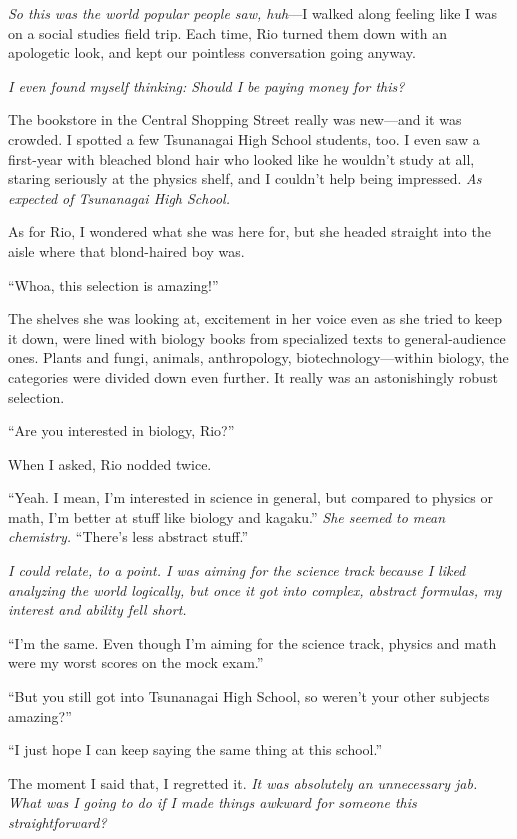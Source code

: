 \documentclass[
    a4paper,
    12pt,
    twoside,
    openany,
    UTF8,
    fontset=windows
]{ctexbook}
\begin{document}
\textit{So this was the world popular people saw, huh}---I walked along feeling like I was on a social studies field trip. Each time, Rio turned them down with an apologetic look, and kept our pointless conversation going anyway.

\textit{I even found myself thinking: Should I be paying money for this?}

The bookstore in the Central Shopping Street really was new---and it was crowded. I spotted a few Tsunanagai High School students, too. I even saw a first-year with bleached blond hair who looked like he wouldn't study at all, staring seriously at the physics shelf, and I couldn't help being impressed. \textit{As expected of Tsunanagai High School.}

As for Rio, I wondered what she was here for, but she headed straight into the aisle where that blond-haired boy was.

``Whoa, this selection is amazing!''

The shelves she was looking at, excitement in her voice even as she tried to keep it down, were lined with biology books from specialized texts to general-audience ones. Plants and fungi, animals, anthropology, biotechnology---within biology, the categories were divided down even further. It really was an astonishingly robust selection.

``Are you interested in biology, Rio?''

When I asked, Rio nodded twice.

``Yeah. I mean, I'm interested in science in general, but compared to physics or math, I'm better at stuff like biology and kagaku.'' \textit{She seemed to mean chemistry.} ``There's less abstract stuff.''

\textit{I could relate, to a point. I was aiming for the science track because I liked analyzing the world logically, but once it got into complex, abstract formulas, my interest and ability fell short.}

``I'm the same. Even though I'm aiming for the science track, physics and math were my worst scores on the mock exam.''

``But you still got into Tsunanagai High School, so weren't your other subjects amazing?''

``I just hope I can keep saying the same thing at this school.''

The moment I said that, I regretted it. \textit{It was absolutely an unnecessary jab. What was I going to do if I made things awkward for someone this straightforward?}
\end{document}
